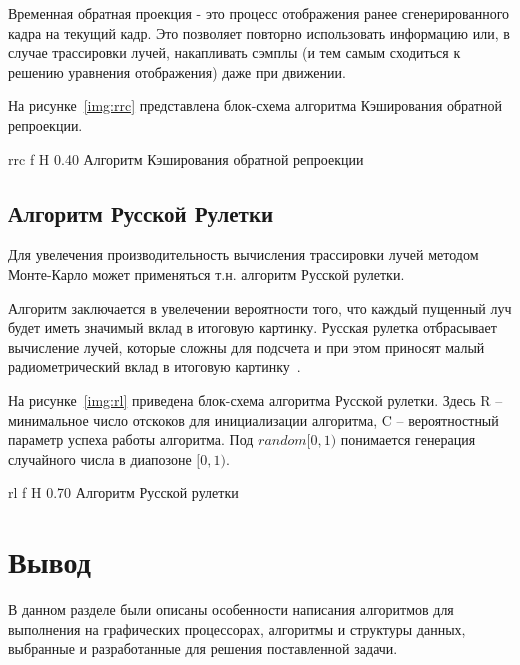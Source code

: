 Временная обратная проекция - это процесс отображения ранее сгенерированного кадра на 
текущий кадр. Это позволяет повторно использовать информацию или, в случае трассировки 
лучей, накапливать сэмплы (и тем самым сходиться к решению уравнения отображения) даже при движении.

На рисунке~\ref{img:rrc} представлена блок-схема алгоритма Кэширования обратной
репроекции.

    {rrc}
    {f}
    {H}
    {0.40\textwidth}
    {Алгоритм Кэширования обратной репроекции}

\subsection{Алгоритм Русской Рулетки}

Для увелечения производительность вычисления трассировки лучей методом 
Монте-Карло может применяться т.н. алгоритм Русской рулетки.

Алгоритм заключается в увелечении вероятности того, что каждый пущенный луч
будет иметь значимый вклад в итоговую картинку. Русская рулетка отбрасывает
вычисление лучей, которые сложны для подсчета и при этом приносят малый 
радиометрический вклад в итоговую картинку~\cite{PBRT3e}.

На рисунке~\ref{img:rl} приведена блок-схема алгоритма Русской рулетки.
Здесь R -- минимальное число отскоков для инициализации алгоритма, 
C -- вероятностный параметр успеха работы алгоритма. Под $random[0,1)$ понимается
генерация случайного числа в диапозоне $[0,1)$.

    {rl}
    {f}
    {H}
    {0.70\textwidth}
    {Алгоритм Русской рулетки}

\section{Вывод}

В данном разделе были описаны особенности написания алгоритмов для выполнения
на графических процессорах, алгоритмы и структуры данных, выбранные 
и разработанные для решения поставленной задачи. 

